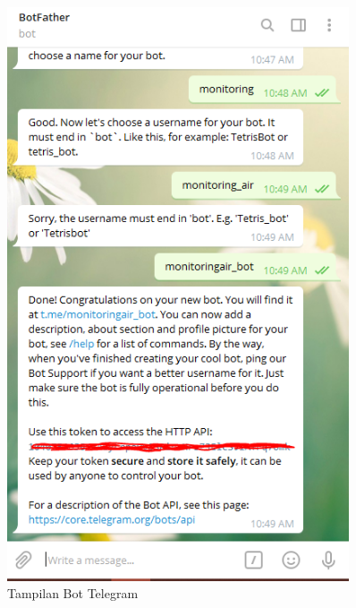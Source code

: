 \begin{enumerate}
\begin{enumerate}
\begin{figure}[H]
    \includegraphics[width=0.9\textwidth]{figures/bot4.png}
    \caption{Tampilan Bot Telegram}
    \label{print}
    \end{figure}
        

\end{enumerate}
\end{enumerate}
